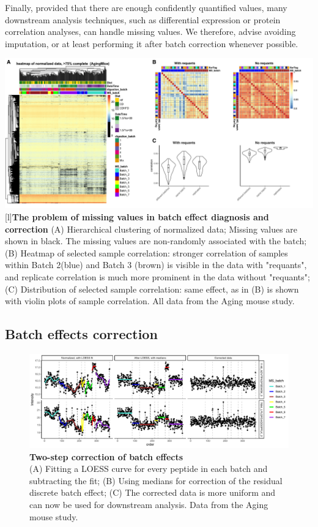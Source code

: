 \documentclass[num-refs]{wiley-article}
\begin{document}
{\begin{tcolorbox}
		Finally, provided that there are enough confidently quantified values, many downstream analysis techniques, such as differential expression or protein correlation analyses, can handle missing values. We therefore, advise avoiding imputation, or at least performing it after batch correction whenever possible. 

		
		\begin{minipage}[h]{\linewidth}
			\includegraphics[width=.9\textwidth]{figures/Fig4_missing_values.pdf}
			[l]{\textbf{The problem of missing values in batch effect diagnosis and correction} }
			\label{fig:batch_fig4_missing_values}
			{\footnotesize  (A) Hierarchical clustering of normalized data; Missing values are shown in black. The missing values are non-randomly associated with the batch; (B) Heatmap of selected sample correlation: stronger correlation of samples within Batch 2(blue) and Batch 3 (brown) is visible in the data with "requants", and replicate correlation is much more prominent in the data without "requants";	(C) Distribution of selected sample correlation: same effect, as in (B) is shown with violin plots of sample correlation. All data from the Aging mouse study.}
		\end{minipage}
	\end{tcolorbox}
	\clearpage
}


\subsection{Batch effects correction}
\begin{figure}[hbt]
	\includegraphics[width=\textwidth]{figures/Fig5_batch_correction.pdf}
	
	\caption{\textbf{Two-step correction of batch effects}  \\
		\footnotesize
		(A) Fitting a LOESS curve for every peptide in each batch and subtracting the fit; (B) Using medians for correction of the residual discrete batch effect; (C) The corrected data is more uniform and can now be used for downstream analysis. Data from the Aging mouse study.}
	\label{fig:batch_fig5_batchCorrection}
\end{figure}
\end{document}
